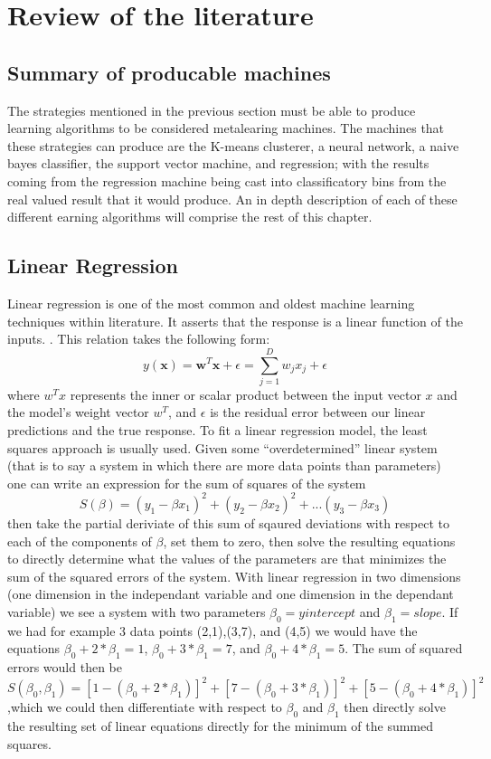 \chapter{Review of the literature}
\label{Chapter2}
\section{Summary of producable machines}
The strategies mentioned in the previous section must be able to produce learning algorithms
to be considered metalearing machines. The machines that these strategies can produce are
the K-means clusterer, a neural network, a naive bayes classifier, the support vector machine,
and regression; with the results coming from the regression machine being cast into
classificatory bins from the real valued result that it would produce. An in depth
description of each of these different earning algorithms will comprise the rest of
this chapter.
\section{Linear Regression}
Linear regression is one of the most common and oldest machine learning techniques within
literature. It asserts that the response is a linear function of the inputs. \cite{murphy}.
This relation takes the following form:
$$ y(\textbf{x}) = \textbf{w}^T\textbf{x} + \epsilon = \sum_{j=1}^{D}w_jx_j + \epsilon $$
where $w^Tx$ represents the inner or scalar product between the input vector $x$ and the
model's weight vector $w^T$, and $\epsilon$ is the residual error between our linear predictions
and the true response.
To fit a linear regression model, the least squares approach is usually used. Given some
 ``overdetermined'' linear system (that is to say a system in which there are more data points
 than parameters) one can write an expression for the sum of squares of the system $$S(\beta) =
 (y_1 - \beta x_1)^2 + (y_2 - \beta x_2)^2 + ... (y_3 - \beta x_3)$$ then take the partial deriviate
 of this sum of sqaured deviations with respect to each of the components of $\beta$, set them to
 zero, then solve the resulting equations to directly determine what the values of the parameters
 are that minimizes the sum of the squared errors of the system. With linear regression in two dimensions
 (one dimension in the independant variable and one dimension in the dependant variable) we see a system
 with two parameters $\beta_0 = y intercept$ and $\beta_1 = slope$. If we had for example 3 data points
 (2,1),(3,7), and (4,5) we would have the equations $\beta_0 + 2*\beta_1 = 1$, $\beta_0 + 3*\beta_1 = 7$,
 and $\beta_0 + 4*\beta_1 = 5$. The sum of squared errors would then be
 $S(\beta_0,\beta_1)= [1 - (\beta_0 + 2*\beta_1)]^2 + [7 - (\beta_0 + 3*\beta_1)]^2 + [5 - (\beta_0 + 4*\beta_1)]^2$
 ,which we could then differentiate with respect to $\beta_0$ and $\beta_1$ then directly solve the resulting set
 of linear equations directly for the minimum of the summed squares.
